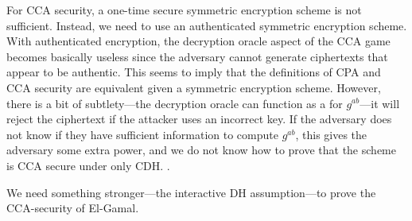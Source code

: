 For CCA security, a one-time secure symmetric encryption scheme is not sufficient. Instead, we need to use an authenticated symmetric encryption scheme. With authenticated encryption, the decryption oracle aspect of the CCA game becomes basically useless since the adversary cannot generate ciphertexts that appear to be authentic. This seems to imply that the definitions of CPA and CCA security are equivalent given a symmetric encryption scheme. However, there is a bit of subtlety---the decryption oracle can function as a  for $g^{ab}$---it will reject the ciphertext if the attacker uses an incorrect key. If the adversary does not know if they have sufficient information to compute $g^{ab}$, this gives the adversary some extra power, and we do not know how to prove that the scheme is CCA secure under only CDH. .

We need something stronger---the interactive DH assumption---to prove the CCA-security of El-Gamal.
